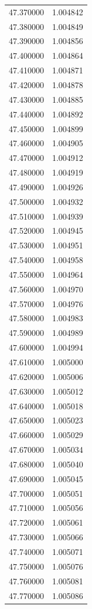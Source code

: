 \begin{tabular}{rr}
47.370000 & 1.004842 \\
47.380000 & 1.004849 \\
47.390000 & 1.004856 \\
47.400000 & 1.004864 \\
47.410000 & 1.004871 \\
47.420000 & 1.004878 \\
47.430000 & 1.004885 \\
47.440000 & 1.004892 \\
47.450000 & 1.004899 \\
47.460000 & 1.004905 \\
47.470000 & 1.004912 \\
47.480000 & 1.004919 \\
47.490000 & 1.004926 \\
47.500000 & 1.004932 \\
47.510000 & 1.004939 \\
47.520000 & 1.004945 \\
47.530000 & 1.004951 \\
47.540000 & 1.004958 \\
47.550000 & 1.004964 \\
47.560000 & 1.004970 \\
47.570000 & 1.004976 \\
47.580000 & 1.004983 \\
47.590000 & 1.004989 \\
47.600000 & 1.004994 \\
47.610000 & 1.005000 \\
47.620000 & 1.005006 \\
47.630000 & 1.005012 \\
47.640000 & 1.005018 \\
47.650000 & 1.005023 \\
47.660000 & 1.005029 \\
47.670000 & 1.005034 \\
47.680000 & 1.005040 \\
47.690000 & 1.005045 \\
47.700000 & 1.005051 \\
47.710000 & 1.005056 \\
47.720000 & 1.005061 \\
47.730000 & 1.005066 \\
47.740000 & 1.005071 \\
47.750000 & 1.005076 \\
47.760000 & 1.005081 \\
47.770000 & 1.005086 \\

\end{tabular}
